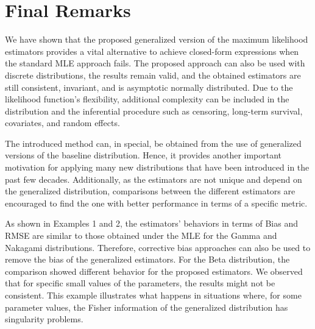 \documentclass[10pt,a4paper,onecolumn]{article} %
\begin{document}




\section{Final Remarks}

We have shown that the proposed generalized version of the maximum likelihood estimators provides a vital alternative to achieve closed-form expressions when the standard MLE approach fails. The proposed approach can also be used with discrete distributions, the results remain valid, and the obtained estimators are still consistent, invariant, and is asymptotic normally distributed. Due to the likelihood function's flexibility, additional complexity can be included in the distribution and the inferential procedure such as censoring, long-term survival, covariates, and random effects.

The introduced method can, in special, be obtained from the use of generalized versions of the baseline distribution. Hence, it provides another important motivation for applying many new distributions that have been introduced in the past few decades. Additionally, as the estimators are not unique and depend on the generalized distribution, comparisons between the different estimators are encouraged to find the one with better performance in terms of a specific metric. 

As shown in Examples 1 and 2, the estimators' behaviors in terms of Bias and RMSE are similar to those obtained under the MLE for the Gamma and Nakagami distributions. Therefore, corrective bias approaches can also be used to remove the bias of the generalized estimators. For the Beta distribution, the comparison showed different behavior for the proposed estimators. We observed that for specific small values of the parameters, the results might not be consistent. This example illustrates what happens in situations where, for some parameter values, the Fisher information of the generalized distribution has singularity problems.
\end{document}
